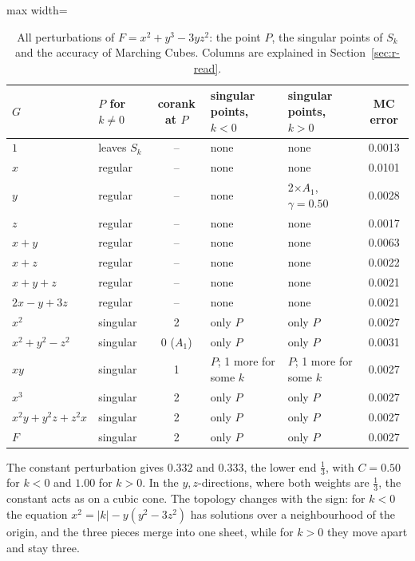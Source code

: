 \documentclass[12pt, a4paper, oneside]{book}
\theoremstyle{plain}
\theoremstyle{definition}
\theoremstyle{remark}
\theoremstyle{definition}
\begin{document}
\begin{table}[!h]
\centering
\footnotesize
\begin{adjustbox}{max width=\textwidth}
\begin{tabular}{l l c l l c}
\toprule
$G$ & $P$ for $k\neq0$ & corank at $P$ & singular points, $k<0$ & singular points, $k>0$ & MC error \\
\midrule
$1$ & leaves $S_k$ & -- & none & none & 0.0013 \\
$x$ & regular & -- & none & none & 0.0101 \\
$y$ & regular & -- & none & 2$\times$$A_1$, $\gamma=0.50$ & 0.0028 \\
$z$ & regular & -- & none & none & 0.0017 \\
$x+y$ & regular & -- & none & none & 0.0063 \\
$x+z$ & regular & -- & none & none & 0.0022 \\
$x+y+z$ & regular & -- & none & none & 0.0021 \\
$2x-y+3z$ & regular & -- & none & none & 0.0021 \\
$x^2$ & singular & 2 & only $P$ & only $P$ & 0.0027 \\
$x^2+y^2-z^2$ & singular & 0 ($A_1$) & only $P$ & only $P$ & 0.0031 \\
$xy$ & singular & 1 & $P$; 1 more for some $k$ & $P$; 1 more for some $k$ & 0.0027 \\
$x^3$ & singular & 2 & only $P$ & only $P$ & 0.0027 \\
$x^2y+y^2z+z^2x$ & singular & 2 & only $P$ & only $P$ & 0.0027 \\
$F$ & singular & 2 & only $P$ & only $P$ & 0.0027 \\
\bottomrule
\end{tabular}
\end{adjustbox}
\caption[Singular points for $x^2+y^3-3yz^2$]{All perturbations of $F=x^2+y^3-3yz^2$: the point $P$, the singular points of $S_k$ and the accuracy of Marching Cubes. Columns are explained in Section~\ref{sec:r-read}.}
\label{tab:r-D4b-points}
\end{table}

The constant perturbation gives $0.332$ and $0.333$, the lower end $\tfrac13$, with $C=0.50$ for $k<0$ and $1.00$ for $k>0$. In the $y,z$-directions, where both weights are $\tfrac13$, the constant acts as on a cubic cone. The topology changes with the sign: for $k<0$ the equation $x^2=|k|-y(y^2-3z^2)$ has solutions over a neighbourhood of the origin, and the three pieces merge into one sheet, while for $k>0$ they move apart and stay three.
\end{document}
